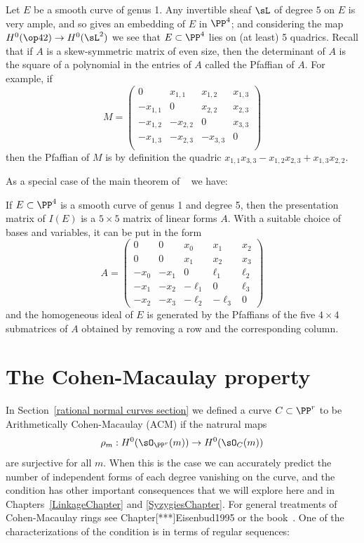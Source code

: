 \begin{fact}
Let $E$ be a smooth curve of genus 1. Any invertible sheaf $\sL$ of degree $5$ on $E$ is very ample, and so gives an embedding of $E$ in $\PP^4$; and considering the map $H^0(\op42) \to H^0(\sL^2)$
we see that $E\subset \PP^4$ lies on (at least) 5 quadrics. 
Recall that if $A$ is a skew-symmetric matrix of even size,
then the determinant of $A$ is the square of a polynomial in the entries of $A$ called the Pfaffian of $A$. For example, if
$$
M = \begin{pmatrix}
0&x_{1,1}&x_{1,2}&x_{1,3}\\
-x_{1,1}&0&x_{2,2}&x_{2,3}\\
-x_{1,2}&-x_{2,2}&0&x_{3,3}\\
-x_{1,3}&-x_{2,3}&-x_{3,3}&0\\
\end{pmatrix}
$$
then the Pfaffian of $M$ is by definition the quadric $x_{1,1}x_{3,3}-x_{1,2}x_{2,3}+x_{1,3}x_{2,2}$.

As a special case of the main theorem of ~\cite{MR453723} we have:
\begin{proposition} \cite[Theorem11]{Eisenbud1995}
If $E\subset \PP^4$ is a smooth curve of genus 1 and degree 5, then the presentation matrix of $I(E)$ is
a $5\times 5$ matrix of linear forms $A$. With a suitable choice of bases and variables, it can be put in the form
$$
A = 
\begin{pmatrix}
0&0&x_0&x_1&x_2\\
0&0&x_1&x_2&x_3\\
-x_0&-x_1&0&\ell_1&\ell_2\\
-x_1&-x_2&-\ell_1&0&\ell_3\\
-x_2&-x_3&-\ell_2&-\ell_3&0
\end{pmatrix}
$$
and
the homogeneous ideal of $E$ is generated by the  Pfaffians of the five $4\times 4$ submatrices of $A$ obtained by removing
a row and the corresponding column.
\end{proposition}
\end{fact}

\section{The Cohen-Macaulay property}\label{ACM}

In Section~\ref{rational normal curves section} we defined a curve $C\subset \PP^{r}$ to be Arithmetically Cohen-Macaulay (ACM) if the natrural maps
$$
\rho_m: H^0(\sO_{\PP^r}(m)) \to H^0(\sO_{C}(m))
$$
are surjective for all $m$. When this is the case we can accurately predict the number of independent forms of
each degree vanishing on the curve, and the condition has other important consequences that we will explore here and in Chapters~\ref{LinkageChapter} and \ref{SyzygiesChapter}. For general treatments of 
Cohen-Macaulay rings see Chapter[***]{Eisenbud1995} or the book~\cite{BrunsHerzog}. One of the characterizations of the condition is in terms of regular sequences:

